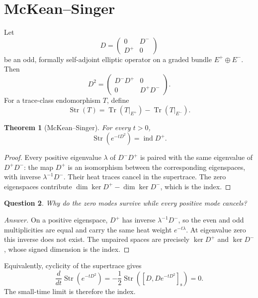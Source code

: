 \documentclass[11pt,oneside,reqno]{book}
\DeclareMathOperator{\Tr}{Tr}
\DeclareMathOperator{\Str}{Str}
\DeclareMathOperator{\ind}{ind}
\theoremstyle{plain}
\newtheorem{theorem}{Theorem}[chapter]
\newtheorem{question}[theorem]{Question}
\theoremstyle{definition}
\theoremstyle{remark}
\newenvironment{answer}{\begin{proof}[Answer]}{\end{proof}}
\begin{document}
\section{McKean--Singer}

Let
\[
 D=
 \begin{pmatrix}
 0&D^-\\
 D^+&0
 \end{pmatrix}
\]
be an odd, formally self-adjoint elliptic operator on a graded bundle
\(E^+\oplus E^-\). Then
\[
 D^2=
 \begin{pmatrix}
 D^-D^+&0\\
 0&D^+D^-
 \end{pmatrix}.
\]
For a trace-class endomorphism \(T\), define
\[
 \Str(T)=\Tr(T|_{E^+})-\Tr(T|_{E^-}).
\]

\begin{theorem}[McKean--Singer]\label{thm:mckean-singer}
For every \(t>0\),
\[
 \Str(e^{-tD^2})=\ind D^+.
\]
\end{theorem}

\begin{proof}
Every positive eigenvalue \(\lambda\) of \(D^-D^+\) is paired with the
same eigenvalue of \(D^+D^-\): the map \(D^+\) is an isomorphism between
the corresponding eigenspaces, with inverse \(\lambda^{-1}D^-\). Their
heat traces cancel in the supertrace. The zero eigenspaces contribute
\(\dim\ker D^+-\dim\ker D^-\), which is the index.
\end{proof}

\begin{question}
Why do the zero modes survive while every positive mode cancels?
\end{question}

\begin{answer}
On a positive eigenspace, \(D^+\) has inverse
\(\lambda^{-1}D^-\), so the even and odd multiplicities are equal and
carry the same heat weight \(e^{-t\lambda}\). At eigenvalue zero this
inverse does not exist. The unpaired spaces are precisely
\(\ker D^+\) and \(\ker D^-\), whose signed dimension is the index.
\end{answer}

Equivalently, cyclicity of the supertrace gives
\[
 \frac{d}{dt}\Str(e^{-tD^2})
 =
 -\frac12\Str([D,De^{-tD^2}]_{\mathrm s})=0.
\]
The small-time limit is therefore the index.
\end{document}
